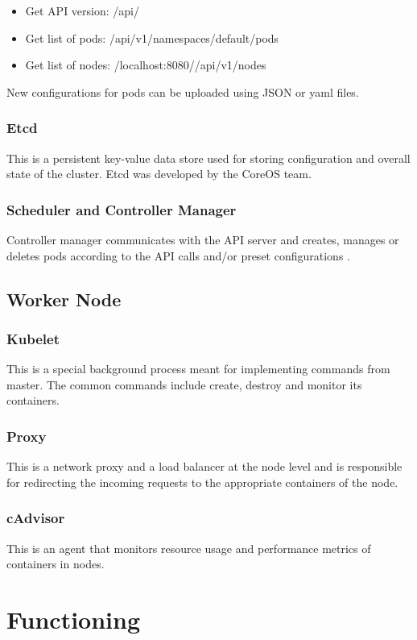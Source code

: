 \documentclass[9pt,twocolumn,twoside]{../../styles/osajnl}
\begin{document}
\begin{itemize}
  \item Get API version: /api/
  \item Get list of pods: /api/v1/namespaces/default/pods
  \item Get list of nodes: /localhost:8080//api/v1/nodes
\end{itemize}

New configurations for pods can be uploaded using JSON or yaml files.

\subsubsection{Etcd}
This is a persistent key-value data store used for storing configuration and overall state of the cluster. Etcd was developed by the CoreOS team.

\subsubsection{Scheduler and Controller Manager}
Controller manager communicates with the API server and creates, manages or deletes pods according to the API calls and/or preset configurations \cite{www-kuberneteswiki}.
\subsection{Worker Node}
\subsubsection{Kubelet}
This is a special background process meant for implementing commands from master. The common commands include create, destroy and monitor its containers.
\subsubsection{Proxy}
This is a network proxy and a load balancer at the node level and is responsible for redirecting the incoming requests to the appropriate containers of the node.
\subsubsection{cAdvisor}
This is an agent that monitors resource usage and performance metrics of containers in nodes.
\section{Functioning}
\end{document}
